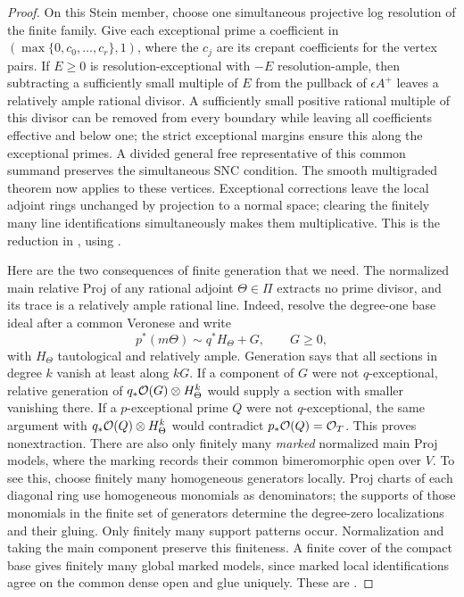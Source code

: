 \begin{proof}
On this Stein member, choose one simultaneous projective log resolution
of the finite family. Give each exceptional prime a coefficient in
\((\max\{0,c_0,\ldots,c_r\},1)\), where the \(c_j\) are its crepant
coefficients for the vertex pairs. If
\(E\geq0\) is resolution-exceptional with \(-E\) resolution-ample, then
subtracting a sufficiently small multiple of \(E\) from the pullback of
\(\epsilon A^+\) leaves a relatively ample rational divisor. A sufficiently
small positive rational multiple of this divisor can be removed from every
boundary while leaving all coefficients effective and below one; the strict
exceptional margins ensure this along the exceptional primes. A divided
general free representative of this common summand preserves the simultaneous SNC
condition. The smooth multigraded theorem now applies to these vertices.
Exceptional corrections leave the local adjoint rings unchanged by
projection to a normal space; clearing the finitely many line
identifications simultaneously makes them multiplicative. This is the
reduction in \cite[Section~7.2]{CB}, using \cite[Theorem~3.1]{DHP}.

Here are the two consequences of finite generation that we need.
The normalized main relative Proj of any rational adjoint \(\Theta\in\Pi\)
extracts no prime divisor, and its trace is a relatively
ample rational line.  Indeed, resolve the degree-one base ideal after
a common Veronese and write
\[
 p^*(m\Theta)\sim q^*H_\Theta+G,\qquad G\geq0,
\]
with \(H_\Theta\) tautological and relatively ample. Generation says that
all sections in degree \(k\) vanish at least along \(kG\).
If a component of \(G\) were not \(q\)-exceptional, relative
generation of \(q_*\mathcal O(G)\otimes H_\Theta^k\) would supply a section with
smaller vanishing there. If a \(p\)-exceptional prime \(Q\) were not
\(q\)-exceptional, the same argument with \(q_*\mathcal O(Q)\otimes H_\Theta^k\)
would contradict \(p_*\mathcal O(Q)=\mathcal O_T\). This proves nonextraction.
There are also only finitely many \emph{marked} normalized main Proj
models, where the marking records their common bimeromorphic open
over \(V\).  To see this, choose finitely many homogeneous generators
locally.  Proj charts of each diagonal ring use homogeneous monomials
as denominators; the supports of those monomials in the finite set of
generators determine the degree-zero localizations and their gluing.
Only finitely many support patterns occur.  Normalization and taking
the main component preserve this finiteness.  A finite cover of the
compact base gives finitely many global marked models, since marked
local identifications agree on the common dense open and glue
uniquely.  These are \cite[Lemmas~7.5 and 7.6]{CB}.


\end{proof}
